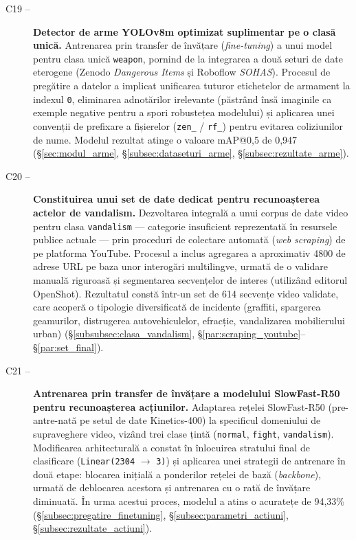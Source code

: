\documentclass[../../main.tex]{subfiles}
\begin{document}
\begin{description}
	\item[C19 --] \textbf{Detector de arme YOLOv8m optimizat suplimentar pe o clasă unică.} Antrenarea prin transfer de învățare (\textit{fine-tuning}) a unui model pentru clasa unică \texttt{weapon}, pornind de la integrarea a două seturi de date eterogene (Zenodo \emph{Dangerous Items} și Roboflow \emph{SOHAS}). Procesul de pregătire a datelor a implicat unificarea tuturor etichetelor de armament la indexul \texttt{0}, eliminarea adnotărilor irelevante (păstrând însă imaginile ca exemple negative pentru a spori robustețea modelului) și aplicarea unei convenții de prefixare a fișierelor (\texttt{zen\_} / \texttt{rf\_}) pentru evitarea coliziunilor de nume. Modelul rezultat atinge o valoare mAP@0,5 de 0,947 (\S\ref{sec:modul_arme}, \S\ref{subsec:dataseturi_arme}, \S\ref{subsec:rezultate_arme}).

	\item[C20 --] \textbf{Constituirea unui set de date dedicat pentru recunoașterea actelor de vandalism.} Dezvoltarea integrală a unui corpus de date video pentru clasa \texttt{vandalism} --- categorie insuficient reprezentată în resursele publice actuale --- prin proceduri de colectare automată (\textit{web scraping}) de pe platforma YouTube. Procesul a inclus agregarea a aproximativ 4800 de adrese URL pe baza unor interogări multilingve, urmată de o validare manuală riguroasă și segmentarea secvențelor de interes (utilizând editorul OpenShot). Rezultatul constă într-un set de 614 secvențe video validate, care acoperă o tipologie diversificată de incidente (graffiti, spargerea geamurilor, distrugerea autovehiculelor, efracție, vandalizarea mobilierului urban) (\S\ref{subsubsec:clasa_vandalism}, \S\ref{par:scraping_youtube}--\S\ref{par:set_final}).

	\item[C21 --] \textbf{Antrenarea prin transfer de învățare a modelului SlowFast-R50 pentru recunoașterea acțiunilor.} Adaptarea rețelei SlowFast-R50 (pre-antre-nată pe setul de date Kinetics-400) la specificul domeniului de supraveghere video, vizând trei clase țintă (\texttt{normal}, \texttt{fight}, \texttt{vandalism}). Modificarea arhitecturală a constat în înlocuirea stratului final de clasificare (\texttt{Linear(2304} $\rightarrow$ \texttt{3)}) și aplicarea unei strategii de antrenare în două etape: blocarea inițială a ponderilor rețelei de bază (\textit{backbone}), urmată de deblocarea acestora și antrenarea cu o rată de învățare diminuată. În urma acestui proces, modelul a atins o acuratețe de 94,33\% (\S\ref{subsec:pregatire_finetuning}, \S\ref{subsec:parametri_actiuni}, \S\ref{subsec:rezultate_actiuni}).
\end{description}
\end{document}
